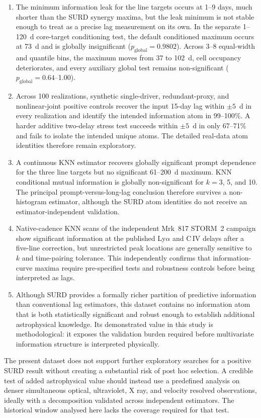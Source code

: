 \documentclass[fleqn,usenatbib]{mnras}
\begin{document}
\begin{enumerate}
\item The minimum information leak for the line targets occurs at 1--9 days, much shorter than the SURD synergy maxima, but the leak minimum is not stable enough to treat as a precise lag measurement on its own. In the separate 1--120~d core-target conditioning test, the default conditioned maximum occurs at 73~d and is globally insignificant ($p_{\mathrm{global}} = 0.9802$). Across 3--8 equal-width and quantile bins, the maximum moves from 37 to 102~d, cell occupancy deteriorates, and every auxiliary global test remains non-significant ($p_{\mathrm{global}}=0.64$--1.00).
\item Across 100 realizations, synthetic single-driver, redundant-proxy, and nonlinear-joint positive controls recover the input 15-day lag within $\pm5$~d in every realization and identify the intended information atom in 99--100\%. A harder additive two-delay stress test succeeds within $\pm5$~d in only 67--71\% and fails to isolate the intended unique atoms. The detailed real-data atom identities therefore remain exploratory.
\item A continuous KNN estimator recovers globally significant prompt dependence for the three line targets but no significant 61--200~d maximum. KNN conditional mutual information is globally non-significant for $k=3$, 5, and 10. The principal prompt-versus-long-lag conclusion therefore survives a non-histogram estimator, although the SURD atom identities do not receive an estimator-independent validation.
\item Native-cadence KNN scans of the independent Mrk~817 STORM~2 campaign show significant information at the published Ly$\alpha$ and C\,IV delays after a five-line correction, but unrestricted peak locations are generally sensitive to $k$ and time-pairing tolerance. This independently confirms that information-curve maxima require pre-specified tests and robustness controls before being interpreted as lags.
\item Although SURD provides a formally richer partition of predictive information than conventional lag estimators, this dataset contains no information atom that is both statistically significant and robust enough to establish additional astrophysical knowledge. Its demonstrated value in this study is methodological: it exposes the validation burden required before multivariate information structure is interpreted physically.
\end{enumerate}

The present dataset does not support further exploratory searches for a positive SURD result without creating a substantial risk of post hoc selection. A credible test of added astrophysical value should instead use a predefined analysis on denser simultaneous optical, ultraviolet, X ray, and velocity resolved observations, ideally with a decomposition validated across independent estimators. The historical window analysed here lacks the coverage required for that test.
\end{document}
